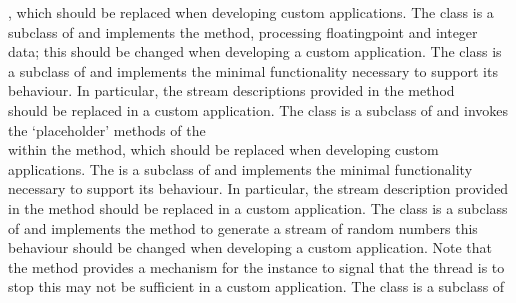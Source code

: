 , which should be replaced when developing custom applications.
The  class is a subclass of
 and implements the  method,
processing floating\longDash{}point and integer data; this should be changed when
developing a custom application.
The  class is a subclass of
 and implements the minimal functionality necessary
to support its behaviour.
In particular, the stream descriptions provided in the method\\
 should be replaced in a custom application.
The  class is a subclass of
 and invokes the `placeholder' methods of the\\
 within the  method, which should
be replaced when developing custom applications.
The  is a subclass of
 and implements the minimal functionality necessary
to support its behaviour.
In particular, the stream description provided in the method
 should be replaced in a custom application.
The  class is a subclass of
 and implements the  method to generate a stream of
random numbers \longDash{} this behaviour should be changed when developing a custom
application.
Note that the method  provides a mechanism for the
 instance to signal that the thread is to
stop \longDash{} this may not be sufficient in a custom application.
The  class is a subclass of
